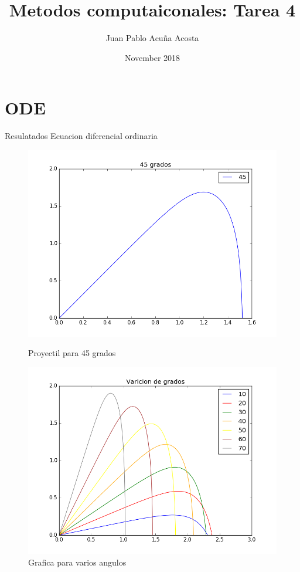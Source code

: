 \documentclass{article}
\title{Metodos computaiconales: Tarea 4
}
\author{ Juan Pablo Acuña Acosta
}
\date{November 2018}
\begin{document}
\maketitle

\section{ODE}

Resulatados Ecuacion diferencial ordinaria\\

\begin{figure}[h]
  \centering
  \begin{minipage}[b]{0.5\textwidth}
    \includegraphics[width=\textwidth]{45.png}
    \caption{Proyectil para 45 grados}
  \end{minipage}
  \hfill
  \begin{minipage}[b]{0.5\textwidth}
    \includegraphics[width=\textwidth]{variosAngulos.png}
    \caption{Grafica para varios angulos}
  \end{minipage}
\end{figure}
\end{document}
